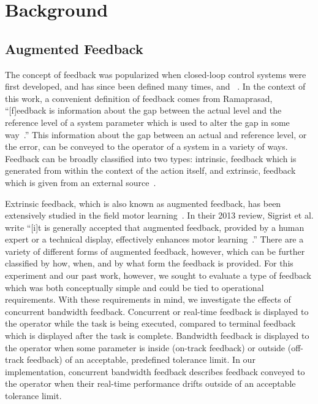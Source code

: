 \documentclass[float=false, crop=false]{standalone}
\begin{document}
\section{Background}
\subsection{Augmented Feedback}
The concept of feedback was popularized when closed-loop control systems were first developed, and has since been defined many times, and ~\cite{Wierner1948}.
In the context of this work, a convenient definition of feedback comes from Ramaprasad, ``[f]eedback is information about the gap between the actual level and the reference level of a system parameter which is used to alter the gap in some way~\cite{Ramaprasad1983}.''
This information about the gap between an actual and reference level, or the error, can be conveyed to the operator of a system in a variety of ways.
Feedback can be broadly classified into two types: intrinsic, feedback which is generated from within the context of the action itself, and extrinsic, feedback which is given from an external source~\cite{laurillard1993rethinking}.

Extrinsic feedback, which is also known as augmented feedback, has been extensively studied in the field motor learning~\cite{Sigrist2013}.
In their 2013 review, Sigrist et al. write ``[i]t is generally accepted that augmented feedback, provided by a human expert or a technical display, effectively enhances motor learning~\cite{Sigrist2013}.''
There are a variety of different forms of augmented feedback, however, which can be further classified by how, when, and by what form the feedback is provided.
For this experiment and our past work, however, we sought to evaluate a type of feedback which was both conceptually simple and could be tied to operational requirements.
With these requirements in mind, we investigate the effects of concurrent bandwidth feedback.
Concurrent or real-time feedback is displayed to the operator while the task is being executed, compared to terminal feedback which is displayed after the task is complete.
Bandwidth feedback is displayed to the operator when some parameter is inside (on-track feedback) or outside (off-track feedback) of an acceptable, predefined tolerance limit.
In our implementation, concurrent bandwidth feedback describes feedback conveyed to the operator when their real-time performance drifts outside of an acceptable tolerance limit.
\end{document}
